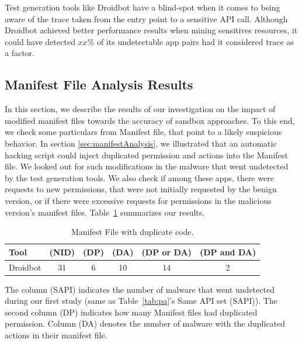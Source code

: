 \begin{obs}{2}{}
 Test generation tools like Droidbot have a blind-spot when it comes to being aware of the trace taken from the entry point to a sensitive API call. Although Droidbot achieved better performance results when mining sensitives resources, it could have detected $xx\%$ of its undetectable app pairs had it considered trace as a factor.
 \end{obs}

\subsection{Manifest File Analysis Results}\label{sec:manifestResults}

In this section, we describe the results of our investigation on the impact of modified manifest files towards the accuracy of sandbox approaches. 
To this end, we check some particulars from Manifest file, that point to a likely suspicious behavior. In section \ref{sec:manifestAnalysis}, we illustrated that an automatic hacking script could inject duplicated permission and actions into the Manifest file. We looked out for such modifications in the malware that went undetected by the test generation tools. We also check if among these apps, there were requests to new permissions, that were not initially requested by the benign version, or if there were excessive requests for permissions in the malicious version's manifest files. Table~\ref{tab:mfa} summarizes our results. 

\begin{table}[ht]
  \caption{Manifest File with duplicate code.}
  \centering
  \begin{small}
 \begin{tabular}{lccccc}
   \toprule
   Tool & (NID) & (DP) & (DA) & (DP or DA) & (DP and DA) \\   \midrule
   Droidbot &  31 & 6 & 10 & 14 & 2 \\ 
   
 \bottomrule
 \end{tabular}
 \end{small}
 \label{tab:mfa}
\end{table}

The column (SAPI) indicates the number of malware that went undetected during our first study (same as Table~\ref{tab:pa}'s Same API set (SAPI)). The second column (DP) indicates how many Manifest files had duplicated permission. Column (DA) denotes the number of malware with the duplicated actions in their manifest file.

